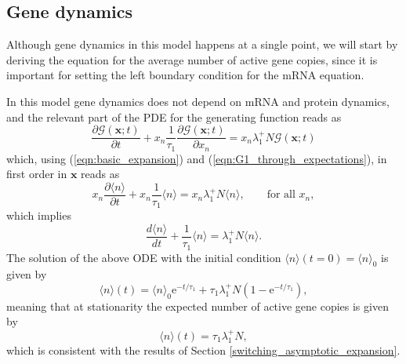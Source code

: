 \documentclass[a4paper, 11pt]{article}
\begin{document}

\subsection{Gene dynamics}
Although gene dynamics in this model happens at a single point, we will start by deriving the equation for the average number of active gene copies, since it is important for setting the left boundary condition for the mRNA equation.

In this model gene dynamics does not depend on mRNA and protein dynamics, and the relevant part of the PDE for the generating function reads as
\begin{equation*}
  \frac{\partial\mathcal G(\mathbf x;t)}{\partial t} + x_n\frac{1}{\tau_1}\frac{\partial\mathcal G(\mathbf x;t)}{\partial x_n} = x_n\lambda_1^+N\mathcal G(\mathbf x;t)
\end{equation*}
which, using (\ref{eqn:basic_expansion}) and (\ref{eqn:G1_through_expectations}), in first order in $\mathbf x$ reads as
\begin{equation*}
  x_n\frac{\partial\langle n\rangle}{\partial t} + x_n\frac{1}{\tau_1}\langle n\rangle = x_n\lambda_1^+N\langle n\rangle,\qquad \text{for all }x_n,
\end{equation*}
which implies
\begin{equation*}
  \frac{d\langle n\rangle}{dt} + \frac{1}{\tau_1}\langle n\rangle = \lambda_1^+N\langle n\rangle.
\end{equation*}
The solution of the above ODE with the initial condition $\langle n\rangle(t=0) = \langle n\rangle_0$ is given by
\begin{equation*}
  \langle n\rangle(t) = \langle n\rangle_0\mathrm e^{-t/\tau_1} + \tau_1\lambda_1^+N\left(1-\mathrm e^{-t/\tau_1}\right),
\end{equation*}
meaning that at stationarity the expected number of active gene copies is given by
\begin{equation}
  \langle n\rangle(t) = \tau_1\lambda_1^+N,
\end{equation} 
which is consistent with the results of Section \ref{switching_asymptotic_expansion}.
\end{document}
